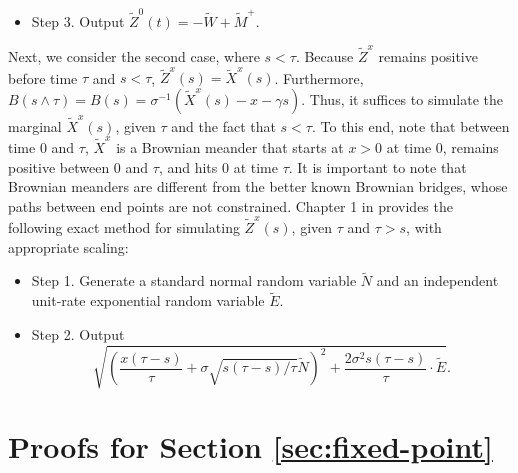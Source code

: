 \documentclass[11pt]{article}
\theoremstyle{definition}
\theoremstyle{plain}
\begin{document}
\begin{appendices}
\begin{itemize}
\[\]
Then, $\left(\tilde M, \tilde W\right)$ has the same distribution as $\left(-\inf_{0\le r\le t} W(r), -W(t)\right)$. 
\item[] Step 3. Output $\tilde Z^0(t) = - \tilde W + \tilde M^+$.
\end{itemize}
Next, we consider the second case, where $s < \tau$. 
Because $\tilde Z^x$ remains positive before time $\tau$ and $s < \tau$, 
$\tilde Z^x(s) = \tilde X^x(s)$. Furthermore, 
$B(s\wedge \tau) = B(s) = \sigma^{-1}\left(\tilde X^x(s) - x - \gamma s\right)$. 
Thus, it suffices to simulate the marginal $\tilde X^x(s)$, given $\tau$ and the fact that $s < \tau$. 
To this end, note that between time $0$ and $\tau$, $\tilde X^x$ is a Brownian meander that starts at $x > 0$ at time $0$, 
remains positive between $0$ and $\tau$, and hits $0$ at time $\tau$. 
It is important to note that Brownian meanders are different from the better known Brownian bridges, 
whose paths between end points are not constrained. 
Chapter 1 in \cite{DevroyeKarasozenKohlerKorn2010} provides the following exact method for simulating $\tilde Z^x(s)$, given $\tau$ and $\tau>s$, with appropriate scaling: 
\begin{itemize}
\item[] Step 1. Generate a standard normal random variable $\tilde N$ and an independent unit-rate exponential random variable $\tilde E$.
\item[] Step 2. Output 
\[
\sqrt{\left(\frac{x(\tau-s)}{\tau} + \sigma \sqrt{s(\tau-s)/\tau}\tilde N\right)^2 + \frac{2\sigma^2 s(\tau-s)}{\tau} \cdot \tilde E}.
\]
\end{itemize}

\section{Proofs for Section \ref{sec:fixed-point}}\label{sec:proofs-fixed-point}


\end{appendices}
\end{document}

